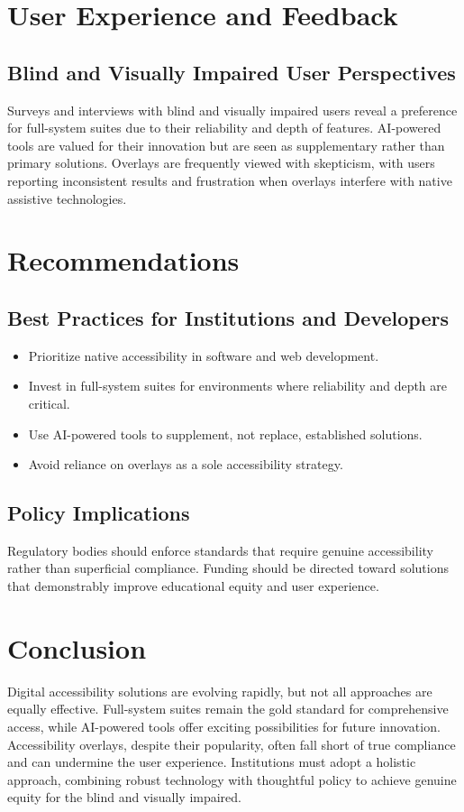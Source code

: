 \section{User Experience and Feedback}
\subsection{Blind and Visually Impaired User Perspectives}
Surveys and interviews with blind and visually impaired users reveal a preference for full-system suites due to their reliability and depth of features\supercite{Doe2020}. AI-powered tools are valued for their innovation but are seen as supplementary rather than primary solutions. Overlays are frequently viewed with skepticism, with users reporting inconsistent results and frustration when overlays interfere with native assistive technologies.

\section{Recommendations}
\subsection{Best Practices for Institutions and Developers}
\begin{itemize}
	\item Prioritize native accessibility in software and web development.
	\item Invest in full-system suites for environments where reliability and depth are critical.
	\item Use AI-powered tools to supplement, not replace, established solutions.
	\item Avoid reliance on overlays as a sole accessibility strategy.
\end{itemize}

\subsection{Policy Implications}
Regulatory bodies should enforce standards that require genuine accessibility rather than superficial compliance. Funding should be directed toward solutions that demonstrably improve educational equity and user experience.

\section{Conclusion}
Digital accessibility solutions are evolving rapidly, but not all approaches are equally effective. Full-system suites remain the gold standard for comprehensive access, while AI-powered tools offer exciting possibilities for future innovation. Accessibility overlays, despite their popularity, often fall short of true compliance and can undermine the user experience. Institutions must adopt a holistic approach, combining robust technology with thoughtful policy to achieve genuine equity for the blind and visually impaired.
